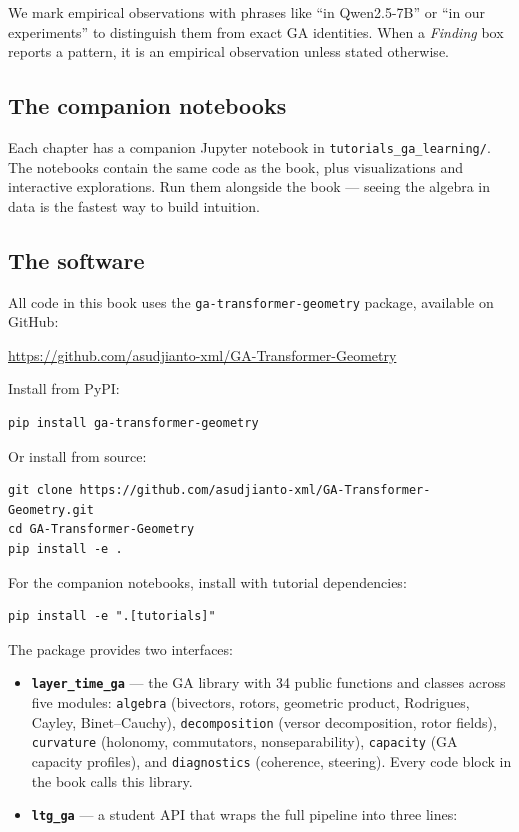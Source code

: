 \documentclass[11pt, twoside, openright]{memoir}
\begin{document}
We mark empirical observations with phrases like ``in Qwen2.5-7B'' or
``in our experiments'' to distinguish them from exact GA identities.
When a \emph{Finding} box reports a pattern, it is an empirical
observation unless stated otherwise.

\subsection*{The companion notebooks}

Each chapter has a companion Jupyter notebook in
\texttt{tutorials\_ga\_learning/}.  The notebooks contain the same code
as the book, plus visualizations and interactive explorations.  Run them
alongside the book --- seeing the algebra in data is the fastest way to
build intuition.

\subsection*{The software}

All code in this book uses the \texttt{ga-transformer-geometry} package,
available on GitHub:

\begin{center}
\url{https://github.com/asudjianto-xml/GA-Transformer-Geometry}
\end{center}

\noindent Install from PyPI:
\begin{lstlisting}
pip install ga-transformer-geometry
\end{lstlisting}

\noindent Or install from source:
\begin{lstlisting}
git clone https://github.com/asudjianto-xml/GA-Transformer-Geometry.git
cd GA-Transformer-Geometry
pip install -e .
\end{lstlisting}

\noindent For the companion notebooks, install with tutorial dependencies:
\begin{lstlisting}
pip install -e ".[tutorials]"
\end{lstlisting}

The package provides two interfaces:

\begin{itemize}[nosep]
\item \textbf{\texttt{layer\_time\_ga}} --- the GA library with 34 public
  functions and classes across five modules: \texttt{algebra} (bivectors,
  rotors, geometric product, Rodrigues, Cayley, Binet--Cauchy),
  \texttt{decomposition} (versor decomposition, rotor fields),
  \texttt{curvature} (holonomy, commutators, nonseparability),
  \texttt{capacity} (GA capacity profiles), and \texttt{diagnostics}
  (coherence, steering).  Every code block in the book calls this library.

\item \textbf{\texttt{ltg\_ga}} --- a student API that wraps the full
  pipeline into three lines:
\end{itemize}
\end{document}
